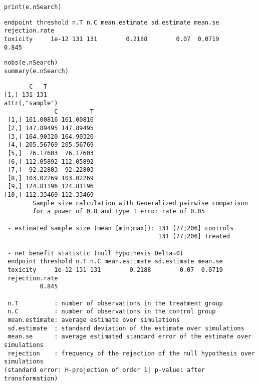 \documentclass[12pt]{article}
\begin{document}
\lstset{language=r,label= ,caption= ,captionpos=b,numbers=none}
\begin{lstlisting}
print(e.nSearch)
\end{lstlisting}

\begin{verbatim}
endpoint threshold n.T n.C mean.estimate sd.estimate mean.se rejection.rate
toxicity     1e-12 131 131        0.2188        0.07  0.0719          0.845
\end{verbatim}


\lstset{language=r,label= ,caption= ,captionpos=b,numbers=none}
\begin{lstlisting}
nobs(e.nSearch)
summary(e.nSearch)
\end{lstlisting}

\begin{verbatim}
       C   T
[1,] 131 131
attr(,"sample")
              C         T
 [1,] 161.00816 161.00816
 [2,] 147.89495 147.89495
 [3,] 164.90320 164.90320
 [4,] 205.56769 205.56769
 [5,]  76.17603  76.17603
 [6,] 112.05892 112.05892
 [7,]  92.22803  92.22803
 [8,] 103.02269 103.02269
 [9,] 124.81196 124.81196
[10,] 112.33469 112.33469
        Sample size calculation with Generalized pairwise comparison
        for a power of 0.8 and type 1 error rate of 0.05 

 - estimated sample size (mean [min;max]): 131 [77;206] controls
                                           131 [77;206] treated

 - net benefit statistic (null hypothesis Delta=0)
 endpoint threshold n.T n.C mean.estimate sd.estimate mean.se
 toxicity     1e-12 131 131        0.2188        0.07  0.0719
 rejection.rate
          0.845

 n.T          : number of observations in the treatment group
 n.C          : number of observations in the control group
 mean.estimate: average estimate over simulations
 sd.estimate  : standard deviation of the estimate over simulations
 mean.se      : average estimated standard error of the estimate over simulations
 rejection    : frequency of the rejection of the null hypothesis over simulations
(standard error: H-projection of order 1| p-value: after transformation)
\end{verbatim}
\end{document}
